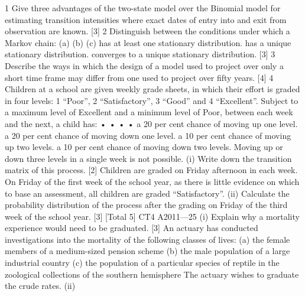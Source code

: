\documentclass[a4paper,12pt]{article}
\begin{document}
\begin{enumerate}

1 Give three advantages of the two-state model over the Binomial model for estimating transition intensities where exact dates of entry into and exit from observation are
known.
[3]
2 Distinguish between the conditions under which a Markov chain:
(a)
(b)
(c)
has at least one stationary distribution.
has a unique stationary distribution.
converges to a unique stationary distribution.
[3]
3 Describe the ways in which the design of a model used to project over only a short time frame may differ from one used to project over fifty years.
[4]
4 Children at a school are given weekly grade sheets, in which their effort is graded in four levels: 1 “Poor”, 2 “Satisfactory”, 3 “Good” and 4 “Excellent”. Subject to a
maximum level of Excellent and a minimum level of Poor, between each week and the next, a child has:
•
•
•
•
a 20 per cent chance of moving up one level.
a 20 per cent chance of moving down one level.
a 10 per cent chance of moving up two levels.
a 10 per cent chance of moving down two levels.
Moving up or down three levels in a single week is not possible.
(i)
Write down the transition matrix of this process.
[2]
Children are graded on Friday afternoon in each week. On Friday of the first week of the school year, as there is little evidence on which to base an assessment, all children
are graded “Satisfactory”.
(ii)
Calculate the probability distribution of the process after the grading on Friday of the third week of the school year.
[3]
[Total 5]
CT4 A2011—25
(i)
Explain why a mortality experience would need to be graduated.
[3]
An actuary has conducted investigations into the mortality of the following classes of
lives:
(a) the female members of a medium-sized pension scheme
(b) the male population of a large industrial country
(c) the population of a particular species of reptile in the zoological
collections of the southern hemisphere
The actuary wishes to graduate the crude rates.
(ii)




\end{enumerate}
\end{document}
